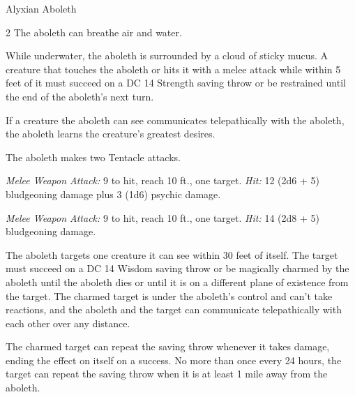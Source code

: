 \documentclass[10pt,a4paper,twoside,bg=print,twocolumn,openany,nodeprecatedcode]{dndbook}
\begin{document}
\begin{DndMonster}[float*=b,width=\textwidth + 8pt]{Alyxian Aboleth}
\begin{multicols}{2}
\DndMonsterBasics[
armor-class = {17 (natural armor)},
hit-points = {\DndDice{18d10 + 36}},
speed = {10 ft., swim 30 ft.}
]
\DndMonsterAbilityScores[
 str = 21,
 dex = 9,
 con = 15,
 int = 18,
 wis = 18,
 cha = 18
]
\DndMonsterDetails[
saving-throws = {Con +6, Int +8, Wis +8},
skills = {History +12, Perception +12},
senses = {darkvision 120 ft., passive perception 22},
languages = {Deep Speech, telepathy 120 ft.},
challenge = 12,
]
The aboleth can breathe air and water.

While underwater, the aboleth is surrounded by a cloud of sticky mucus. A creature that touches the aboleth or hits it with a melee attack while within 5 feet of it must succeed on a DC 14 Strength saving throw or be restrained until the end of the aboleth's next turn.

If a creature the aboleth can see communicates telepathically with the aboleth, the aboleth learns the creature's greatest desires.

The aboleth makes two Tentacle attacks.

\textsl{Melee Weapon Attack:} 9 to hit, reach 10 ft., one target. \textsl{Hit:} 12 (2d6 + 5) bludgeoning damage plus 3 (1d6) psychic damage.

\textsl{Melee Weapon Attack:} 9 to hit, reach 10 ft., one target. \textsl{Hit:} 14 (2d8 + 5) bludgeoning damage.

The aboleth targets one creature it can see within 30 feet of itself. The target must succeed on a DC 14 Wisdom saving throw or be magically charmed by the aboleth until the aboleth dies or until it is on a different plane of existence from the target. The charmed target is under the aboleth's control and can't take reactions, and the aboleth and the target can communicate telepathically with each other over any distance.

The charmed target can repeat the saving throw whenever it takes damage, ending the effect on itself on a success. No more than once every 24 hours, the target can repeat the saving throw when it is at least 1 mile away from the aboleth.


\end{multicols}
\end{DndMonster}
\end{document}
